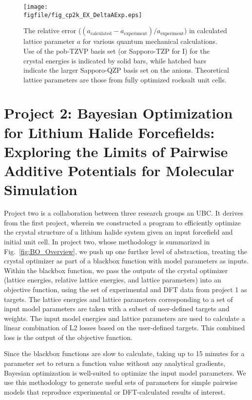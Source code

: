 \documentclass[titlepage,11pt]{article}
\newcommand{\figfile}{./figures}
\begin{document}
\begin{figure}
	\texttt{[image: \\figfile/fig\_cp2k\_EX\_DeltaAExp.eps]}
	\caption{\label{fig:cp2k_EX_DeltaAExp} The relative error ($(a_{\text{calculated}} - a_{\text{experiment}})/a_{\text{experiment}}$) in calculated lattice parameter $a$ for various quantum mechanical calculations. Use of the pob-TZVP basis set (or Sapporo-TZP for I) for the crystal energies is indicated by solid bars, while hatched bars indicate the larger Sapporo-QZP basis set on the anions. Theoretical lattice parameters are those from fully optimized rocksalt unit cells.}
\end{figure}



\section{Project 2: Bayesian Optimization for Lithium Halide Forcefields: Exploring the Limits of Pairwise Additive Potentials for Molecular Simulation}

Project two is a collaboration between three research groups an UBC. It derives from the first project, wherein we constructed a program to efficiently optimize the crystal structure of a lithium halide system given an input forcefield and initial unit cell. In project two, whose methodology is summarized in Fig.~\ref{fig:BO_Overview}, we push up one further level of abstraction, treating the crystal optimizer as part of a blackbox function with model parameters as inputs. Within the blackbox function, we pass the outputs of the crystal optimizer (lattice energies, relative lattice energies, and lattice parameters) into an objective function, using the set of experimental and DFT data from project 1 as targets. The lattice energies and lattice parameters corresponding to a set of input model parameters are taken with a subset of user-defined targets and weights. The input model energies and lattice parameters are used to calculate a linear combination of L2 losses based on the user-defined targets. This combined loss is the output of the objective function.

Since the blackbox functions are slow to calculate, taking up to 15 minutes for a parameter set to return a function value without any analytical gradients, Bayesian optimization is well-suited to optimize the input model parameters. We use this methodology to generate useful sets of parameters for simple pairwise models that reproduce experimental or DFT-calculated results of interest.
\end{document}
